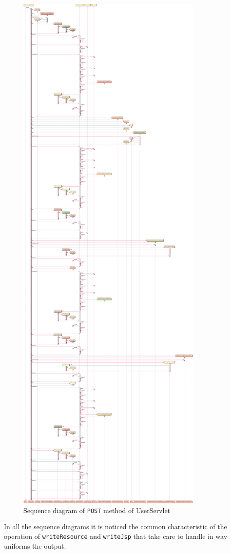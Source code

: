 \begin{figure}[H]
    \centering
    \includegraphics[width=\textwidth,height=0.9\textheight,keepaspectratio]{Schemas/UserServlet_doPost.svg.pdf}
    \caption{Sequence diagram of \texttt{POST} method of UserServlet}
    \label{fig:UserServlet_doPost}
\end{figure}

In all the sequence diagrams it is noticed the common characteristic
of the operation of \texttt{writeResource} and \texttt{writeJsp} 
that take care to handle in way uniforms the output.
